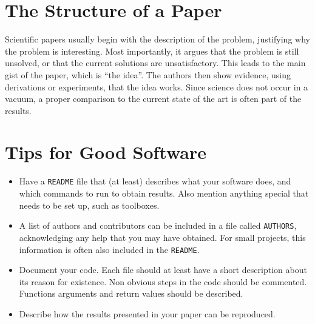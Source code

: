 \documentclass[10pt,conference,compsocconf]{IEEEtran}
\begin{document}
\section{The Structure of a Paper}
\label{sec:structure-paper}
Scientific papers usually begin with the description of the problem,
justifying why the problem is interesting. Most importantly, it argues
that the problem is still unsolved, or that the current solutions are
unsatisfactory. This leads to the main gist of the paper, which is
``the idea''. The authors then show evidence, using derivations or
experiments, that the idea works. Since science does not occur in a
vacuum, a proper comparison to the current state of the art is often
part of the results.


\section{Tips for Good Software}
\label{sec:tips-software}

\begin{itemize}
\item Have a \texttt{README} file that (at least) describes what your
  software does, and which commands to run to obtain results. Also
  mention anything special that needs to be set up, such as
  toolboxes.
\item A list of authors and contributors can be included in a file
  called \texttt{AUTHORS}, acknowledging any help that you may have
  obtained. For small projects, this information is often also
  included in the \texttt{README}.
\item Document your code. Each file should at least have a short
  description about its reason for existence. Non obvious steps in the
  code should be commented. Functions arguments and return values should be described.
\item Describe how the results presented in your paper can be reproduced.
\end{itemize}



\end{document}
